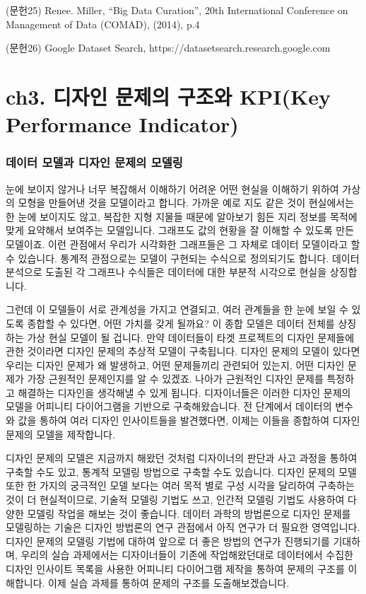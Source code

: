 \documentclass[
  letterpaper,
]{book}
\begin{document}
(문헌25) Renee. Miller, ``Big Data Curation'', 20th International
Conference on Management of Data (COMAD), (2014), p.4

(문헌26) Google Dataset Search,
https://datasetsearch.research.google.com

\chapter{ch3. 디자인 문제의 구조와 KPI(Key Performance
Indicator)}\label{ch3.-uxb514uxc790uxc778-uxbb38uxc81cuxc758-uxad6cuxc870uxc640-kpikey-performance-indicator}

\subsection{데이터 모델과 디자인 문제의
모델링}\label{uxb370uxc774uxd130-uxbaa8uxb378uxacfc-uxb514uxc790uxc778-uxbb38uxc81cuxc758-uxbaa8uxb378uxb9c1}

눈에 보이지 않거나 너무 복잡해서 이해하기 어려운 어떤 현실을 이해하기
위하여 가상의 모형을 만들어낸 것을 모델이라고 합니다. 가까운 예로 지도
같은 것이 현실에서는 한 눈에 보이지도 않고, 복잡한 지형 지물들 때문에
알아보기 힘든 지리 정보를 목적에 맞게 요약해서 보여주는 모델입니다.
그래프도 값의 현황을 잘 이해할 수 있도록 만든 모델이죠. 이런 관점에서
우리가 시각화한 그래프들은 그 자체로 데이터 모델이라고 할 수 있습니다.
통계적 관점으로는 모델이 구현되는 수식으로 정의되기도 합니다. 데이터
분석으로 도출된 각 그래프나 수식들은 데이터에 대한 부분적 시각으로
현실을 상징합니다.

그런데 이 모델들이 서로 관계성을 가지고 연결되고, 여러 관계들을 한 눈에
보일 수 있도록 종합할 수 있다면, 어떤 가치를 갖게 될까요? 이 종합 모델은
데이터 전체를 상징하는 가상 현실 모델이 될 겁니다. 만약 데이터들이 타겟
프로젝트의 디자인 문제들에 관한 것이라면 디자인 문제의 추상적 모델이
구축됩니다. 디자인 문제의 모델이 있다면 우리는 디자인 문제가 왜
발생하고, 어떤 문제들끼리 관련되어 있는지, 어떤 디자인 문제가 가장
근원적인 문제인지를 알 수 있겠죠. 나아가 근원적인 디자인 문제를 특정하고
해결하는 디자인을 생각해낼 수 있게 됩니다. 디자이너들은 이러한 디자인
문제의 모델을 어피니티 다이어그램을 기반으로 구축해왔습니다. 전 단계에서
데이터의 변수와 값을 통하여 여러 디자인 인사이트들을 발견했다면, 이제는
이들을 종합하여 디자인 문제의 모델을 제작합니다.

디자인 문제의 모델은 지금까지 해왔던 것처럼 디자이너의 판단과 사고
과정을 통하여 구축할 수도 있고, 통계적 모델링 방법으로 구축할 수도
있습니다. 디자인 문제의 모델 또한 한 가지의 궁극적인 모델 보다는 여러
목적 별로 구성 시각을 달리하여 구축하는 것이 더 현실적이므로, 기술적
모델링 기법도 쓰고, 인간적 모델링 기법도 사용하여 다양한 모델링 작업을
해보는 것이 좋습니다. 데이터 과학의 방법론으로 디자인 문제를 모델링하는
기술은 디자인 방법론의 연구 관점에서 아직 연구가 더 필요한 영역입니다.
디자인 문제의 모델링 기법에 대하여 앞으로 더 좋은 방법의 연구가
진행되기를 기대하며, 우리의 실습 과제에서는 디자이너들이 기존에
작업해왔던대로 데이터에서 수집한 디자인 인사이트 목록을 사용한 어피니티
다이어그램 제작을 통하여 문제의 구조를 이해합니다. 이제 실습 과제를
통하여 문제의 구조를 도출해보겠습니다.
\end{document}
